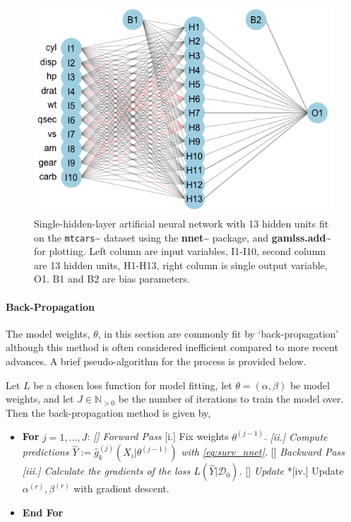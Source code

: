 \documentclass[
  letterpaper,
]{scrbook}
\let\oldparagraph\paragraph
\renewcommand{\paragraph}[1]{\oldparagraph{#1}\mbox{}}
\providecommand{\tightlist}{%
  \setlength{\itemsep}{0pt}\setlength{\parskip}{0pt}}\usepackage{longtable,booktabs,array}
\theoremstyle{plain}
\theoremstyle{definition}
\theoremstyle{remark}
\begin{document}
\begin{figure}

{\centering \includegraphics{./images/neuralnetworks/ann.png}

}

\caption{\label{fig-surv-ann}Single-hidden-layer artificial neural
network with 13 hidden units fit on the
\texttt{mtcars}\textasciitilde{}\cite{datamtcars} dataset using the
\textbf{nnet}\textasciitilde{}\cite{pkgnnet} package, and
\textbf{gamlss.add}\textasciitilde{}\cite{pkggamlssadd} for plotting.
Left column are input variables, I1-I10, second column are 13 hidden
units, H1-H13, right column is single output variable, O1. B1 and B2 are
bias parameters.}

\end{figure}

\paragraph{Back-Propagation}

The model weights, \(\theta\), in this section are commonly fit by
`back-propagation' although this method is often considered inefficient
compared to more recent advances. A brief pseudo-algorithm for the
process is provided below.

Let \(L\) be a chosen loss function for model fitting, let
\(\theta = (\alpha, \beta)\) be model weights, and let
\(J \in \mathbb{N}_{> 0}\) be the number of iterations to train the
model over. Then the back-propagation method is given by,

\begin{itemize}
\tightlist
\item
  \textbf{For} \(j = 1,...,J\): \emph{{[}{]} \emph{Forward Pass}
  }{[}i.{]} Fix weights \(\theta^{(j-1)}\). \emph{{[}ii.{]} Compute
  predictions \(\hat{Y} := \hat{g}^{(j)}_k(X_i|\theta^{(j-1)})\) with
  \ref{eq:surv_nnet}. }{[}{]} \emph{Backward Pass} \emph{{[}iii.{]}
  Calculate the gradients of the loss \(L(\hat{Y}|\mathcal{D}_0)\).
  }{[}{]} \emph{Update} *{[}iv.{]} Update \(\alpha^{(r)}, \beta^{(r)}\)
  with gradient descent.
\item
  \textbf{End For}
\end{itemize}
\end{document}
